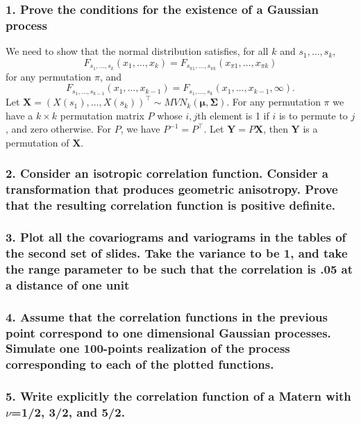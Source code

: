 \documentclass[12pt]{article}
\newcommand{\m}[1]{\mathbf{\bm{#1}}}
\begin{document}
\subsubsection*{1. Prove the conditions for the existence of a Gaussian process}

We need to show that the normal distribution satisfies, for all $k$ and $s_1,\ldots,s_k$,
\[ F_{s_1,\ldots,s_k}(x_1,\ldots,x_k)=F_{s_{\pi 1},\ldots,s_{\pi k}}(x_{\pi 1},\ldots,x_{\pi k}) \]
for any permutation $\pi$, and
\[ F_{s_1,\ldots,s_{k-1}}(x_1,\ldots,x_{k-1})=F_{s_1,\ldots,s_k}(x_1,\ldots,x_{k-1},\infty). \]
Let $\m{X}=(X(s_1),\ldots,X(s_k))^\top\sim MVN_k(\m{\mu},\m{\Sigma})$. For any permutation $\pi$ we have a $k\times k$ permutation matrix $P$ whose $i,j$th element is 1 if $i$ is to permute to $j$, and zero otherwise. For $P$, we have $P^{-1}=P^\top$. Let $\m{Y}=P\m{X}$, then $\m{Y}$ is a permutation of $\m{X}$.
\bigskip


\subsubsection*{2. Consider an isotropic correlation function. Consider a transformation that produces geometric anisotropy. Prove that the resulting correlation function is positive definite.}

\subsubsection*{3. Plot all the covariograms and variograms in the tables of the second set of slides. Take the variance to be 1, and take the range parameter to be such that the correlation is .05 at a distance of one unit}

\subsubsection*{4. Assume that the correlation functions in the previous point correspond to one dimensional Gaussian processes. Simulate one 100-points realization of the process corresponding to each of the plotted functions.}

\subsubsection*{5. Write explicitly the correlation function of a Matern with $\nu$=1/2, 3/2, and 5/2.}
\end{document}
